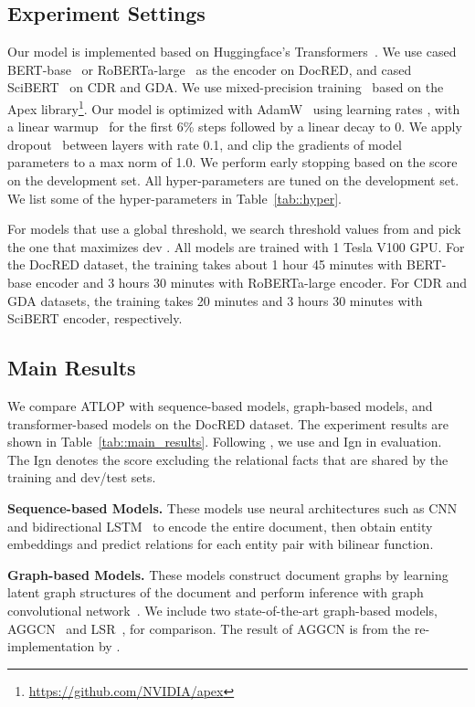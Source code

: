 \documentclass[letterpaper]{article}
\begin{document}
\subsection{Experiment Settings}
Our model is implemented based on Huggingface's Transformers~\cite{wolf2019huggingface}.
We use cased BERT-base~\cite{Devlin2019BERTPO} or RoBERTa-large~\cite{Liu2019RoBERTaAR} as the encoder on DocRED, and cased SciBERT~\cite{Beltagy2019SciBERTAP} on CDR and GDA.
We use mixed-precision training~\cite{Micikevicius2018MixedPT} based on the Apex library\footnote{\url{https://github.com/NVIDIA/apex}}.
Our model is optimized with AdamW~\cite{Loshchilov2019DecoupledWD} using learning rates , with a linear warmup~\cite{Goyal2017AccurateLM} for the first 6\% steps followed by a linear decay to 0.
We apply dropout~\cite{Srivastava2014DropoutAS} between layers with rate 0.1, and clip the gradients of model parameters to a max norm of 1.0.
We perform early stopping based on the  score on the development set.
All hyper-parameters are tuned on the development set.
We list some of the hyper-parameters in Table~\ref{tab::hyper}.

For models that use a global threshold, we search threshold values from  and pick the one that maximizes dev .
All models are trained with 1 Tesla V100 GPU.
For the DocRED dataset, the training takes about 1 hour 45 minutes with BERT-base encoder and 3 hours 30 minutes with RoBERTa-large encoder.
For CDR and GDA datasets, the training takes 20 minutes and 3 hours 30 minutes with SciBERT encoder, respectively.
\subsection{Main Results}
We compare ATLOP with sequence-based models, graph-based models, and transformer-based models on the DocRED dataset.
The experiment results are shown in Table~\ref{tab::main_results}.
Following \citet{Yao2019DocREDAL}, we use  and Ign  in evaluation.
The Ign  denotes the  score excluding the relational facts that are shared by the training and dev/test sets.

\smallskip
\noindent
\textbf{Sequence-based Models.}
These models use neural architectures such as CNN~\cite{Goodfellow2015DeepL} and bidirectional LSTM~\cite{Schuster1997BidirectionalRN} to encode the entire document, then obtain entity embeddings and predict relations for each entity pair with bilinear function.

\smallskip
\noindent
\textbf{Graph-based Models.} 
These models construct document graphs by learning latent graph structures of the document and perform inference with graph convolutional network~\cite{Kipf2017SemiSupervisedCW}.
We include two state-of-the-art graph-based models, AGGCN~\cite{Guo2019AttentionGG} and LSR~\cite{Nan2020ReasoningWL}, for comparison.
The result of AGGCN is from the re-implementation by \citet{Nan2020ReasoningWL}.
\end{document}
